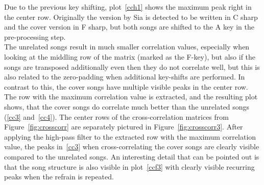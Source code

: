 \noindent Due to the previous key shifting, plot~\ref{cch1} shows the maximum peak right in the center row. Originally the version by Sia is detected to be written in C sharp and the cover version in F sharp, but both songs are shifted to the A key in the pre-processing step.\\
\noindent The unrelated songs result in much smaller correlation values, especially when looking at the middling row of the matrix (marked as the F-key), but also if the songs are transposed additionally even then they do not correlate well, but this is also related to the zero-padding when additional key-shifts are performed. 
In contrast to this, the cover songs have multiple visible peaks in the center row. 
\noindent The row with the maximum correlation value is extracted, and the resulting plot shows, that the cover songs do correlate much better than the unrelated songs (\ref{cc3} and~\ref{cc4}).
The center rows of the cross-correlation matrices from Figure~\ref{fig:crosscorr} are separately pictured in Figure~\ref{fig:crosscorr3}. After applying the high-pass filter to the extracted row with the maximum correlation value, the peaks in~\ref{cc3} when cross-correlating the cover songs are clearly visible compared to the unrelated songs. An interesting detail that can be pointed out is that the song structure is also visible in plot~\ref{ccf3} with clearly visible recurring peaks when the refrain is repeated.
